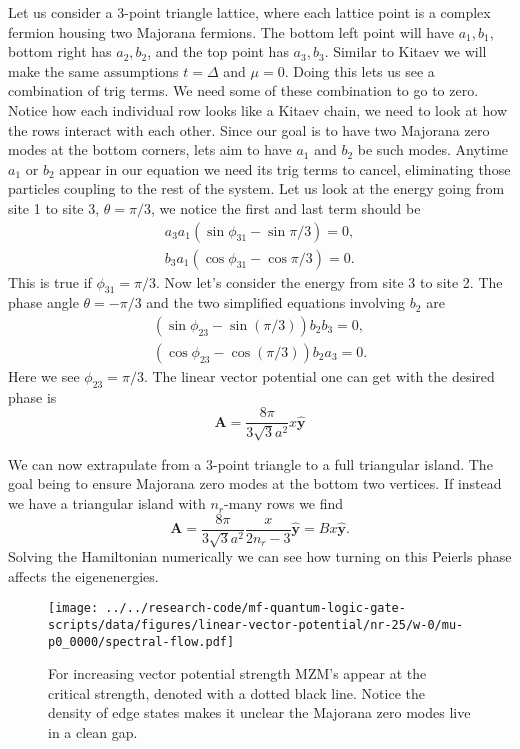 \documentclass[aps,prb,showpacs,twocolumn,amsmath,amssymb,superscriptaddress]{revtex4-2}
\let\oldhat\hat
\renewcommand{\hat}[1]{\oldhat{\mathbf{#1}}}
\renewcommand{\vec}[1]{\mathbf{#1}}
\newcommand{\de}{\Delta}
\begin{document}
Let us consider a 3-point triangle lattice, where each lattice point is a complex fermion housing two Majorana fermions.
The bottom left point will have $a_1, b_1$, bottom right has $a_2, b_2$, and the top point has $a_3, b_3$.
Similar to Kitaev we will make the same assumptions $t=\de$ and $\mu=0$.
Doing this lets us see a combination of trig terms.
We need some of these combination to go to zero.
Notice how each individual row looks like a Kitaev chain, we need to look at how the rows interact with each other.
Since our goal is to have two Majorana zero modes at the bottom corners, lets aim to have $a_1$ and $b_2$ be such modes.
Anytime $a_1$ or $b_2$ appear in our equation we need its trig terms to cancel, eliminating those particles coupling to the rest of the system.
Let us look at the energy going from site 1 to site 3, $\theta = \pi/3$, we notice the first and last term should be
\begin{align}
  a_3 a_1 (\sin\phi_{31} - \sin\pi/3) = 0, \\
  b_3 a_1 (\cos\phi_{31} - \cos\pi/3) = 0.
\end{align}
This is true if $\phi_{31} = \pi/3$.
Now let's consider the energy from site 3 to site 2.
The phase angle $\theta = -\pi/3$ and the two simplified equations involving $b_2$ are
\begin{align}
  (\sin\phi_{23} - \sin(\pi/3)) b_2 b_3 = 0, \nonumber \\
  (\cos\phi_{23} - \cos(\pi/3)) b_2 a_3 = 0. \nonumber
\end{align}
Here we see $\phi_{23} = \pi/3$.
The linear vector potential one can get with the desired phase is
\begin{equation}
  \vec{A} = \dfrac{8 \pi}{3 \sqrt{3} a^2} x \hat{y}
\end{equation}

We can now extrapulate from a 3-point triangle to a full triangular island.
The goal being to ensure Majorana zero modes at the bottom two vertices.
If instead we have a triangular island with $n_r$-many rows we find
\begin{equation}
  \vec{A} = \dfrac{8 \pi}{3 \sqrt{3} a^2} \dfrac{x}{2n_r-3} \hat{y} = Bx\hat{y}.
\end{equation}
Solving the Hamiltonian numerically we can see how turning on this Peierls phase affects the eigenenergies.
\begin{figure}[h]
\texttt{[image: ../../research-code/mf-quantum-logic-gate-scripts/data/figures/linear-vector-potential/nr-25/w-0/mu-p0\_0000/spectral-flow.pdf]}
\label{fig: full-triangle-spectral}
\caption{For increasing vector potential strength MZM's appear at the critical strength, denoted with a dotted black line. Notice the density of edge states makes it unclear the Majorana zero modes live in a clean gap.}
\end{figure}
\end{document}
